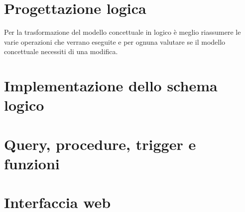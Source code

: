 \documentclass[a4paper,twoside]{article}
\begin{document}
\section{Progettazione logica}
Per la trasformazione del modello concettuale in logico è meglio riassumere le varie operazioni che verrano eseguite e per ognuna valutare se il modello concettuale necessiti di una modifica.



\section{Implementazione dello schema logico}

\section{Query, procedure, trigger e funzioni}

\section{Interfaccia web}
\end{document}
